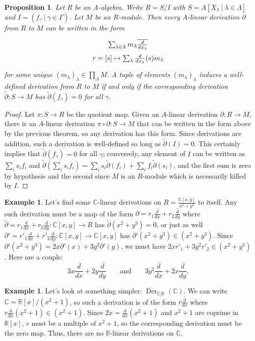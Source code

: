 \documentclass{amsart}[12pt]
\def\Der{\operatorname{Der}}
\newcommand{\R}{{\mathbb{R}}}
\newcommand{\C}{\mathbb{C}}
\numberwithin{equation}{section}
\theoremstyle{plain} %
\newtheorem{prop}[equation]{Proposition}
\theoremstyle{definition}
\newtheorem{ex}[equation]{Example}
\theoremstyle{remark}
\begin{document}
\begin{prop} Let $R$ be an $A$-algebra. Write $R=S/I$ with $S=A[X_\lambda \ | \ \lambda\in \Lambda]$ and $I=(f_\gamma \ | \ \gamma\in\Gamma)$. Let $M$ be an $R$-module. Then every $A$-linear derivation $\partial$ from  $R$ to $M$ can be written in the form
\[ \xymatrix@R=0pc{ \sum_{\lambda\in \Lambda} m_\lambda \overline{\frac{d}{dx_{\lambda}}} \\
r = [ s] \mapsto  \sum_\lambda \frac{d}{dx_{\lambda}}(s) m_\lambda}\]
for some unique $(m_{\lambda})_\lambda \in \prod_{\Lambda} M$.
A tuple of elements $(m_\lambda)_\lambda$ induces a well-defined derivation from $R$ to $M$ if and only if the corresponding derivation $\widetilde{\partial}:S\to M$ has $\widetilde{\partial}(f_\gamma)=0$ for all $\gamma$.
\end{prop}
\begin{proof}
Let $\pi:S\to R$ be the quotient map. Given an $A$-linear derivation $\partial:R\to M$, there is an $A$-linear derivation $\pi\circ \partial:S\to M$ that can be written in the form above by the previous theorem, so any derivation has this form. Since derivations are addition, such a derivation is well-defined so long as $\widetilde{\partial}(I)=0$. This certainly implies that $\widetilde{\partial}(f_\gamma)=0$ for all $\gamma$; conversely, any element of $I$ can be written as $\sum_i s_i f_i$ and $\widetilde{\partial} (\sum_i s_i f_i) =\sum_i s_i \widetilde{\partial}(f_i) + \sum_i f_i \widetilde{\partial}(s_i)$, and the first sum is zero by hypothesis and the second since $M$ is an $R$-module which is necessarily killed by $I$.
\end{proof}

\begin{ex} Let's find some $\C$-linear derivations on $R=\frac{\C[x,y]}{x^2+y^3}$ to itself. Any such derivation must be a map of the form $\partial = r_1 \overline{\frac{d}{dx}} + r_2 \overline{\frac{d}{dy}}$ where $\widetilde{\partial} = r_1 \frac{d}{dx} + r_2 \frac{d}{dy}: \C[x,y]\to R$ has $\widetilde{\partial}(x^2+y^3) =0$, or just as well $\partial' = r'_1 \frac{d}{dx} + r'_2 \frac{d}{dy}: \C[x,y]\to \C[x,y]$ has ${\partial}'(x^2+y^3) \in (x^2+y^3)$.
Since $\partial'(x^2+y^3) = 2x\partial'(x) + 3y^2 \partial'(y)$, we must have $2x r'_1 + 3y^2 r'_2\in (x^2+y^3)$. Here are a couple:
\[ 3x \overline{\frac{d}{dx}} + 2y \overline{\frac{d}{dy}} \qquad\text{and}\qquad 3y^2 \overline{\frac{d}{dx}} + 2x \overline{\frac{d}{dy}}.\]
\end{ex}

\begin{ex} Let's look at something simpler: $\Der_{\C|\R}(\C)$. We can write $\C=\R[x]/(x^2+1)$, so such a derivation is of the form $r \overline{\frac{d}{dx}}$ where $r {\frac{d}{dx}} (x^2+1)\in (x^2+1)$. Since $2x= \frac{d}{dx} (x^2+1)$ and $x^2+1$ are coprime in $\R[x]$, $r$ must be a multiple of $x^2+1$, so the corresponding derivation must be the zero map. Thus, there are no $\R$-linear derivations on $\C$.
\end{ex}
\end{document}
